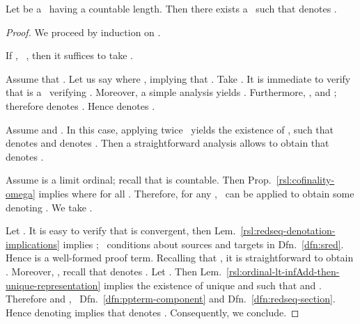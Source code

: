 \begin{proposition}
\label{rsl:denotation-existence}
Let  be a \redseq\ having a countable length. Then there exists a \pnpterm\  such that  denotes .
\end{proposition}

\begin{proof}
We proceed by induction on .

If , \ie\ , then it suffices to take .

Assume that . Let us say  where , implying that .
Take .
It is immediate to verify that  is a \ppterm\ verifying . Moreover, a simple analysis yields .
Furthermore, , and ; therefore  denotes . Hence  denotes .

Assume  and . 
In this case, applying twice \ih\ yields the existence of ,  such that  denotes  and  denotes .
Then a straightforward analysis allows to obtain that  denotes .

Assume  is a limit ordinal; recall that  is countable. Then Prop.~\ref{rsl:cofinality-omega} implies  where  for all .
Therefore, for any , \ih\ can be applied to obtain some  denoting .
We take .

Let . It is easy to verify that  is convergent, then Lem.~\ref{rsl:redseq-denotation-implications} implies 
; \confer\ conditions about sources and targets in Dfn.~\ref{dfn:sred}.
Hence  is a well-formed proof term.
Recalling that , it is straightforward to obtain .
Moreover, , recall that  denotes .
Let . Then Lem.~\ref{rsl:ordinal-lt-infAdd-then-unique-representation} implies the existence of unique  and  such that  and .
Therefore  and , \confer\ Dfn.~\ref{dfn:ppterm-component} and Dfn.~\ref{dfn:redseq-section}.
Hence  denoting  implies that  denotes .
Consequently, we conclude.
\end{proof}











